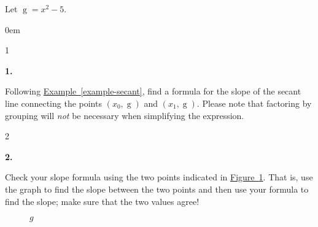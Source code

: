 \documentclass[12pt,]{book}
\theoremstyle{plain}
\theoremstyle{definition}
\numberwithin{equation}{section}
\newenvironment{exercisegroup}%
{\medskip\noindent}%
{\par\bigskip}%
\newlength{\exercisegroupindent}%
\newlength{\exercisegroupitemwidth}%
\newenvironment{exercisegrouplist}%
{\vspace{-\partopsep}%
\begin{adjustwidth}{\exercisegroupindent}{0em}}%
{\end{adjustwidth}%
\vspace{-\partopsep}%
\vspace{\baselineskip}}%
\newenvironment{exercisegroupbycol}[1]%
{\begin{exercisegrouplist}%
\vspace{-\multicolsep}%
\begin{multicols}{#1}%
\setlength{\parindent}{0em}%
\setlength{\exercisegroupitemwidth}{\linewidth}}%
{\end{multicols}%
\vspace{-\multicolsep}%
\end{exercisegrouplist}}%
\newenvironment{exercisegroupitem}[1]%
{\begin{minipage}[t]{\exercisegroupitemwidth}
\vspace{0pt}%
{\bfseries#1}%
\rule{0pt}{\baselineskip}}{\strut%
\end{minipage}%
\hspace{\columnsep}}%
\providecommand\phantomsection{}
\newcommand{\fe}[2]{\mathop{{#1}{\left(#2\right)}}}
\newcommand{\point}[2]{\left(#1,#2\right)}
\begin{document}
\begin{exercisegroup}%
Let \(\fe{g}{x}=x^2-5\).%
\par
\begin{exercisegroupbycol}{1}%
\begin{exercisegroupitem}{1. }\phantomsection\hypertarget{exercise-7}{\null}
Following \hyperref[example-secant]{Example~\ref*{example-secant}}, find a formula for the slope of the secant line connecting the points \(\point{x_0}{\fe{g}{x_0}}\) and \(\point{x_1}{\fe{g}{x_1}}\). Please note that factoring by grouping will \emph{not} be necessary when simplifying the expression.%
\end{exercisegroupitem}%
\par%
\begin{multicols}{2}
\begin{exercisegroupitem}{2. }\phantomsection\hypertarget{exercise-8}{\null}
Check your slope formula using the two points indicated in \hyperref[figure-secant-exercise]{Figure~\ref*{figure-secant-exercise}}. That is, use the graph to find the slope between the two points and then use your formula to find the slope; make sure that the two values agree!%
\begin{figure}
\centering
{
}
\caption{\(g\)\label{figure-secant-exercise}}
\end{figure}
\end{exercisegroupitem}%
\par%
\end{multicols}%
\end{exercisegroupbycol}%
\end{exercisegroup}%
\typeout{************************************************}
\typeout{************************************************}
\end{document}
